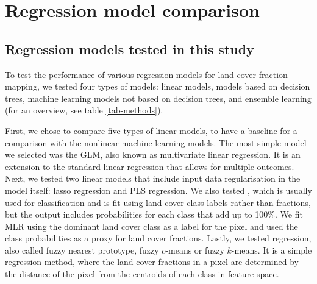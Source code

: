 \documentclass[review,authoryear,3p]{elsarticle}
\begin{document}


\appendix

\section{Regression model comparison} \label{sec-model-comparison}

\subsection{Regression models tested in this study}

To test the performance of various regression models for land cover fraction mapping, we tested four types of models: linear models, models based on decision trees, machine learning models not based on decision trees, and ensemble learning (for an overview, see table \ref{tab-methods}).


First, we chose to compare five types of linear models, to have a baseline for a comparison with the nonlinear machine learning models.
The most simple model we selected was the \gls{GLM}, also known as multivariate linear regression.
It is an extension to the standard linear regression that allows for multiple outcomes.
Next, we tested two linear models that include input data regularisation in the model itself: lasso regression and \gls{PLS} regression.
We also tested , which is usually used for classification and is fit using land cover class labels rather than fractions, but the output includes probabilities for each class that add up to 100\%.
We fit \gls{MLR} using the dominant land cover class as a label for the pixel and used the class probabilities as a proxy for land cover fractions.
Lastly, we tested  regression, also called fuzzy nearest prototype, fuzzy $c$-means or fuzzy $k$-means.
It is a simple regression method, where the land cover fractions in a pixel are determined by the distance of the pixel from the centroids of each class in feature space.

\end{document}
